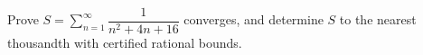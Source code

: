Prove $\displaystyle S=\sum_{n=1}^{\infty}\dfrac{1}{n^2+4n+16}$ converges, and determine $S$ to the nearest thousandth with certified rational bounds.
